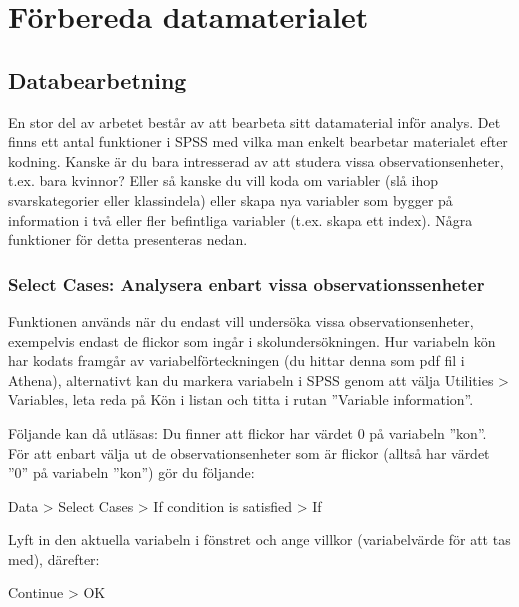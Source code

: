 \documentclass[
]{book}
\begin{document}
\hypertarget{part-fuxf6rbereda-datamaterialet}{%
\part*{Förbereda datamaterialet}\label{part-fuxf6rbereda-datamaterialet}}

\hypertarget{databearbetning}{%
\chapter{Databearbetning}\label{databearbetning}}

En stor del av arbetet består av att bearbeta sitt datamaterial inför analys. Det finns ett antal funktioner
i SPSS med vilka man enkelt bearbetar materialet efter kodning. Kanske är du bara intresserad av att
studera vissa observationsenheter, t.ex. bara kvinnor? Eller så kanske du vill koda om variabler (slå ihop
svarskategorier eller klassindela) eller skapa nya variabler som bygger på information i två eller fler
befintliga variabler (t.ex. skapa ett index). Några funktioner för detta presenteras nedan.

\hypertarget{select-cases-analysera-enbart-vissa-observationssenheter}{%
\section{Select Cases: Analysera enbart vissa observationssenheter}\label{select-cases-analysera-enbart-vissa-observationssenheter}}

Funktionen används när du endast vill undersöka vissa observationsenheter, exempelvis endast de
flickor som ingår i skolundersökningen. Hur variabeln kön har kodats framgår av variabelförteckningen
(du hittar denna som pdf fil i Athena), alternativt kan du markera variabeln i SPSS
genom att välja Utilities \textgreater{} Variables, leta reda på Kön i listan och titta i rutan ''Variable
information''.

Följande kan då utläsas: Du finner att flickor har värdet 0 på variabeln ''kon''. För att enbart välja ut de observationsenheter som
är flickor (alltså har värdet ''0'' på variabeln ''kon'') gör du följande:

Data \textgreater{} Select Cases \textgreater{} If condition is satisfied \textgreater{} If

Lyft in den aktuella variabeln i fönstret och ange villkor (variabelvärde för att tas med), därefter:

Continue \textgreater{} OK
\end{document}
